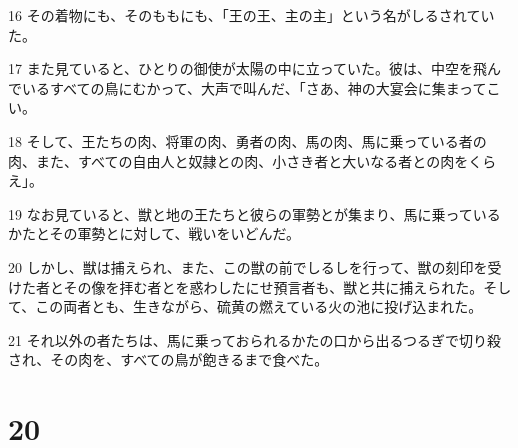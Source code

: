 \par 16 その着物にも、そのももにも、「王の王、主の主」という名がしるされていた。
\par 17 また見ていると、ひとりの御使が太陽の中に立っていた。彼は、中空を飛んでいるすべての鳥にむかって、大声で叫んだ、「さあ、神の大宴会に集まってこい。
\par 18 そして、王たちの肉、将軍の肉、勇者の肉、馬の肉、馬に乗っている者の肉、また、すべての自由人と奴隷との肉、小さき者と大いなる者との肉をくらえ」。
\par 19 なお見ていると、獣と地の王たちと彼らの軍勢とが集まり、馬に乗っているかたとその軍勢とに対して、戦いをいどんだ。
\par 20 しかし、獣は捕えられ、また、この獣の前でしるしを行って、獣の刻印を受けた者とその像を拝む者とを惑わしたにせ預言者も、獣と共に捕えられた。そして、この両者とも、生きながら、硫黄の燃えている火の池に投げ込まれた。
\par 21 それ以外の者たちは、馬に乗っておられるかたの口から出るつるぎで切り殺され、その肉を、すべての鳥が飽きるまで食べた。

\chapter{20}


